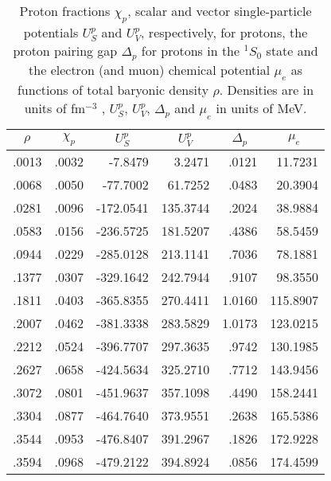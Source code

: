 \begin{table}
\caption{Proton fractions $\chi_p$, scalar and vector
single-particle potentials
$U_S^p$ and $U_V^p$, respectively, for protons, 
the proton pairing gap $\Delta_p$ for protons in the
$^1S_0$ state and
the electron (and muon) chemical potential $\mu_e$
as functions of total baryonic density $\rho$. 
Densities are in units
of fm$^{-3}$ , $U_S^p$, $U_V^p$, 
$\Delta_p$ and $\mu_e$ in units of MeV.}
\begin{tabular}{rrrrrr}
\multicolumn{1}{c}{$\rho$}&
\multicolumn{1}{c}{$\chi_p$}&
\multicolumn{1}{c}{$U_S^p$}&
\multicolumn{1}{c}{$U_V^p$}&
\multicolumn{1}{c}{$\Delta_p$}&
\multicolumn{1}{c}{$\mu_e$}\\ \hline
   .0013 &     .0032 &  -7.8479 &   3.2471 &  .0121 & 11.7231 \\ 
   .0068 &     .0050 & -77.7002 &  61.7252 &  .0483 & 20.3904 \\
   .0281 &     .0096 & -172.0541&  135.3744&   .2024& 38.9884 \\
   .0583 &     .0156 &-236.5725 & 181.5207 &  .4386 & 58.5459 \\
   .0944 &     .0229 &-285.0128 & 213.1141 &  .7036 & 78.1881 \\
   .1377 &     .0307 &-329.1642 & 242.7944 &  .9107 & 98.3550 \\
   .1811 &     .0403 &-365.8355 & 270.4411 & 1.0160 & 115.8907 \\
   .2007 &     .0462 &-381.3338 & 283.5829 & 1.0173 & 123.0215 \\
   .2212 &     .0524 &-396.7707 & 297.3635 &  .9742 & 130.1985 \\
   .2627 &     .0658 &-424.5634 & 325.2710 &  .7712 & 143.9456 \\
   .3072 &     .0801 &-451.9637 & 357.1098 &  .4490 & 158.2441 \\
   .3304 &     .0877 &-464.7640 & 373.9551 &  .2638 & 165.5386 \\
   .3544 &     .0953 &-476.8407 & 391.2967 &  .1826 & 172.9228 \\
   .3594 &     .0968 &-479.2122 & 394.8924 &  .0856 & 174.4599 \\ 
\end{tabular}
\label{tab:tab1}
\end{table}

